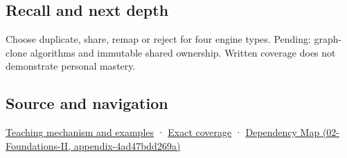 \subsection{Recall and next depth}\label{appendix-1340cd1ce582-recall-and-next-depth}

Choose duplicate, share, remap or reject for four engine types. Pending: graph-clone algorithms and immutable shared ownership. Written coverage does not demonstrate personal mastery.

\subsection{Source and navigation}\label{appendix-1340cd1ce582-source-and-navigation}

\hyperref[01-foundations-i-ch003-copy-a-meaning-rather-than-just-its-bytes]{Teaching mechanism and examples} · \hyperref[appendix-fd090d982a15-m009---parts-127-147]{Exact coverage} · \href{../02-Foundations-II/main.pdf\#nameddest=appendix-4ad47bdd269a}{Dependency Map (02-Foundations-II, appendix-4ad47bdd269a)}
